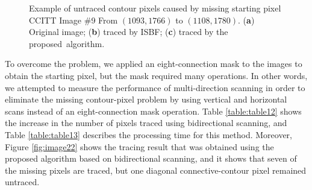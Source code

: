 \documentclass[sensors,article,accept,moreauthors,pdftex,10pt,a4paper]{mdpi}
\begin{document}
\begin{figure}[H]
	\centering
	 
	\caption{Example of untraced contour pixels caused by missing starting pixel CCITT Image \#9 From $(1093, 1766)$ to $(1108, 1780)$. (\textbf{a}) Original image; (\textbf{b}) traced by ISBF; (\textbf{c}) traced by the proposed~algorithm.}
	\label{fig:image21}
\end{figure}

To overcome the problem, we applied an eight-connection mask to the images to obtain the starting pixel, but the mask required many operations. In other words, we attempted to measure the performance of multi-direction scanning in order to eliminate the missing contour-pixel problem by using vertical and horizontal scans instead of an eight-connection mask operation. Table \ref{table:table12} shows the increase in the number of pixels traced using bidirectional scanning, and Table \ref{table:table13} describes the processing time for this method. Moreover, Figure \ref{fig:image22} shows the tracing result that was obtained using the proposed algorithm based on bidirectional scanning, and it shows that seven of the missing pixels are traced, but one diagonal connective-contour pixel remained untraced. 
\end{document}
